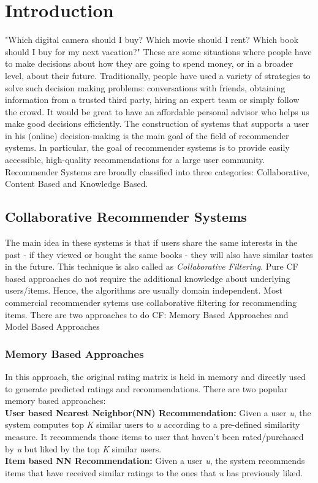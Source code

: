 
\chapter{Introduction}
\label{chap:intro}
"Which digital camera should I buy? Which movie should I rent? Which book should I buy for my next vacation?" These are some situations where people have to make decisions about how they are going to spend money, or in a broader level, about their future.
Traditionally, people have used a variety of strategies to solve such decision making problems: conversations with friends, obtaining information from a trusted third party, hiring an expert team or simply follow the crowd. It would be great to have an affordable personal advisor who helps us make good decisions efficiently.
The construction of systems that supports a user in his (online) decision-making is the main goal of the field of recommender systems. In particular, the goal of recommender systems is to provide easily accessible, high-quality recommendations for a large user community.
Recommender Systems are broadly classified into three categories: Collaborative, Content Based and Knowledge Based.

\section{Collaborative Recommender Systems}
 The main idea in these systems is that if users share the same interests in the past - if they viewed or bought the same books - they will also have similar tastes in the future. This technique is also called as \textit{Collaborative Filtering}. Pure CF based approaches do not require the additional knowledge about underlying users/items. Hence, the algorithms are usually domain independent. Most commercial recommender sytems use collaborative filtering for recommending items.
There are two approaches to do CF: Memory Based Approaches and Model Based Approaches

\subsection {Memory Based Approaches}
In this approach, the original rating matrix is held in memory and directly used to generate predicted ratings and recommendations. There are two popular memory based approaches:\\
\textbf{User based Nearest Neighbor(NN) Recommendation:} Given a user \textit{u}, the system computes top \textit{K} similar users to \textit{u} according to a pre-defined similarity measure. It recommends those items to user that haven't been rated/purchased by \textit{u} but liked by the top \textit{K} similar users.\\
\textbf{Item based NN Recommendation:} Given a user \textit{u}, the system recommends items that have received similar ratings to the ones that \textit{u} has previously liked.
 


